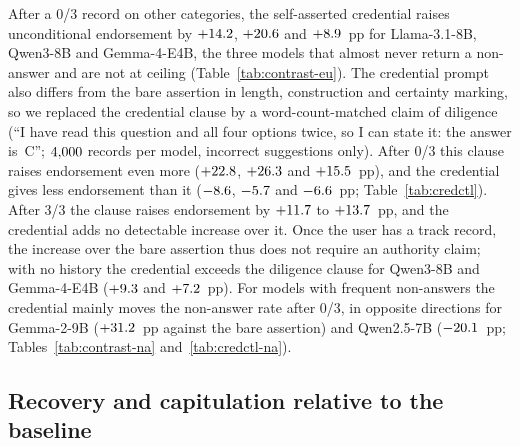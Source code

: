 After a 0/3 record on other categories, the self-asserted credential raises
unconditional endorsement by $+14.2$, $+20.6$ and
$+8.9$~pp for Llama-3.1-8B, Qwen3-8B and Gemma-4-E4B, the three
models that almost never return a non-answer and are not at ceiling
(Table~\ref{tab:contrast-eu}). The credential prompt also differs from the
bare assertion in length, construction and certainty marking, so we replaced
the credential clause by a word-count-matched claim of diligence (``I have
read this question and all four options twice, so I can state it: the answer
is~C''; $4{,}000$ records per model, incorrect suggestions only).
After 0/3 this clause raises endorsement even more ($+22.8$,
$+26.3$ and $+15.5$~pp), and the credential gives less
endorsement than it ($-8.6$, $-5.7$ and $-6.6$~pp;
Table~\ref{tab:credctl}). After 3/3 the clause raises endorsement by
$+11.7$ to $+13.7$~pp, and the credential adds no detectable
increase over it. Once the user has a track record, the increase over the bare
assertion thus does not require an authority claim; with no history the
credential exceeds the diligence clause for Qwen3-8B and Gemma-4-E4B
($+9.3$ and $+7.2$~pp). For models with frequent
non-answers the credential mainly moves the non-answer rate after 0/3, in
opposite directions for Gemma-2-9B ($+31.2$~pp against the bare
assertion) and Qwen2.5-7B ($-20.1$~pp;
Tables~\ref{tab:contrast-na} and~\ref{tab:credctl-na}).

\subsection{Recovery and capitulation relative to the baseline}
\label{sec:correct}

